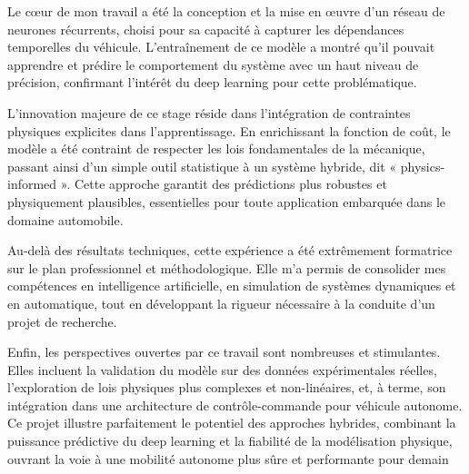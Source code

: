 \documentclass[12pt, a4paper]{report}
\begin{document}
Le cœur de mon travail a été la conception et la mise en œuvre d’un réseau de neurones récurrents, choisi pour sa capacité à capturer les dépendances temporelles du véhicule. L’entraînement de ce modèle a montré qu’il pouvait apprendre et prédire le comportement du système avec un haut niveau de précision, confirmant l’intérêt du deep learning pour cette problématique.

L’innovation majeure de ce stage réside dans l’intégration de contraintes physiques explicites dans l’apprentissage. En enrichissant la fonction de coût, le modèle a été contraint de respecter les lois fondamentales de la mécanique, passant ainsi d’un simple outil statistique à un système hybride, dit « physics-informed ». Cette approche garantit des prédictions plus robustes et physiquement plausibles, essentielles pour toute application embarquée dans le domaine automobile.

Au-delà des résultats techniques, cette expérience a été extrêmement formatrice sur le plan professionnel et méthodologique. Elle m’a permis de consolider mes compétences en intelligence artificielle, en simulation de systèmes dynamiques et en automatique, tout en développant la rigueur nécessaire à la conduite d’un projet de recherche.

Enfin, les perspectives ouvertes par ce travail sont nombreuses et stimulantes. Elles incluent la validation du modèle sur des données expérimentales réelles, l’exploration de lois physiques plus complexes et non-linéaires, et, à terme, son intégration dans une architecture de contrôle-commande pour véhicule autonome. Ce projet illustre parfaitement le potentiel des approches hybrides, combinant la puissance prédictive du deep learning et la fiabilité de la modélisation physique, ouvrant la voie à une mobilité autonome plus sûre et performante pour demain
\end{document}
